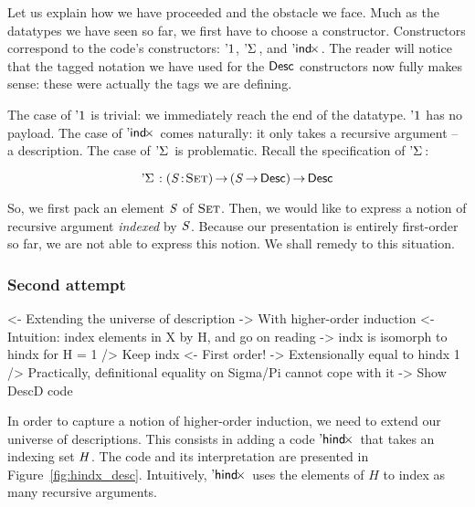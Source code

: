 Let us explain how we have proceeded and the obstacle we face. Much as
the datatypes we have seen so far, we first have to choose a
constructor. Constructors correspond to the code's constructors:
$\DUnit$, $\DSigma{\!}{\!}$, and $\DIndx{\!}$. The reader will notice
that the tagged notation we have used for the $\Desc$ constructors now
fully makes sense: these were actually the tags we are
defining.

The case of $\DUnit$ is trivial: we immediately reach the end of the
datatype. $\DUnit$ has no payload. The case of $\DIndx{\!}$ comes
naturally: it only takes a recursive argument -- a description. The
case of $\DSigma{\!}{\!}$ is problematic. Recall the specification of
$\DSigma{\!}{\!}$:

\[    \DSigma{\!}{\!} : \PI{\V{S}}{\Set} \PIS{\V{S} \To \Desc} \Desc      \]

So, we first pack an element $\V{S}$ of $\Set$. Then, we would like to
express a notion of recursive argument \emph{indexed} by $\V{S}$. Because
our presentation is entirely first-order so far, we are not able to
express this notion. We shall remedy to this situation.


\subsubsection{Second attempt}

\begin{wstructure}
<- Extending the universe of description
    -> With higher-order induction
    <- Intuition: index elements in X by H, and go on reading
        -> indx is isomorph to hindx for H = 1
    /> Keep indx
        <- First order!
        -> Extensionally equal to hindx 1
        /> Practically, definitional equality on Sigma/Pi cannot cope with it
    -> Show DescD code
\end{wstructure}

In order to capture a notion of higher-order induction, we need to
extend our universe of descriptions. This consists in adding a code
$\DHindx{\!}{\!}$ that takes an indexing set $\V{H}$. The code and its
interpretation are presented in
Figure~\ref{fig:hindx_desc}. Intuitively, $\DHindx{\!}{\!}$ uses the
elements of $H$ to index as many recursive arguments.

